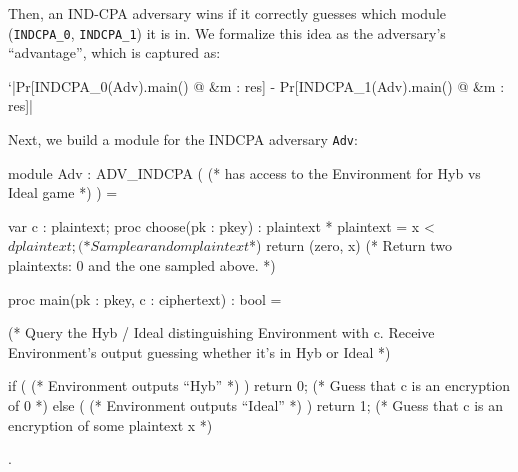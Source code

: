 \documentclass{article}[12pt]
\newcommand{\code}[1]{\texttt{#1}}%
\begin{document}
Then, an IND-CPA adversary wins if it correctly guesses which module (\code{INDCPA\_0}, \code{INDCPA\_1}) it is in. We formalize this idea as the adversary's ``advantage'', which is captured as:

\begin{easycrypt}
	`|Pr[INDCPA_0(Adv).main() @ &m : res] - Pr[INDCPA_1(Adv).main() @ &m : res]|
\end{easycrypt}

Next, we build a module for the INDCPA adversary \code{Adv}:

\begin{easycrypt}
module Adv : ADV_INDCPA ( (* has access to the Environment for Hyb vs Ideal game *) ) = {
	var c : plaintext;
	proc choose(pk : pkey) : plaintext * plaintext = {
		x <$ dplaintext;	(* Sample a random plaintext $*)
		return (zero, x)	(* Return two plaintexts: 0 and the one sampled above. *)
	}

	proc main(pk : pkey, c : ciphertext) : bool = {
		(* Query the Hyb / Ideal distinguishing Environment with c. Receive Environment's output guessing whether it's in Hyb or Ideal *)

		if ( (* Environment outputs ``Hyb'' *) ) {
			return 0;	(* Guess that c is an encryption of 0 *)
		}
		else ( (* Environment outputs ``Ideal'' *) ) {
			return 1;	(* Guess that c is an encryption of some plaintext x *)
		}

	}
}.
\end{easycrypt}

{\small{


}}
\end{document}
